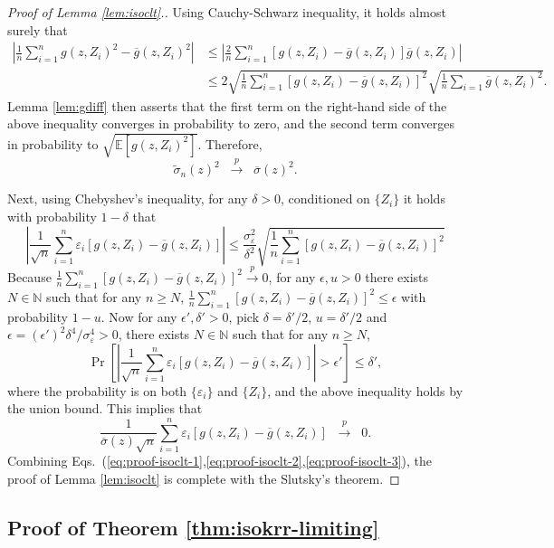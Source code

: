 \documentclass[aos]{imsart}
\renewcommand{\tilde}{\widetilde}
\renewcommand{\bar}{\overline}
\theoremstyle{plain}
\theoremstyle{definition}
\theoremstyle{definition}
\begin{document}
\begin{appendix}
\begin{proof}[Proof of Lemma \ref{lem:isoclt}.]
Using Cauchy-Schwarz inequality, it holds almost surely that
\begin{align*}
\left|\frac{1}{n}\sum_{i=1}^n g(z,Z_i)^2-\bar g(z,Z_i)^2\right| &\leq \left|\frac{2}{n}\sum_{i=1}^n [g(z,Z_i)-\bar g(z,Z_i)]\bar g(z,Z_i)\right|\\
&\leq 2\sqrt{\frac{1}{n}\sum_{i=1}^n[g(z,Z_i)-\bar g(z,Z_i)]^2}\sqrt{\frac{1}{n}\sum_{i=1}\bar g(z,Z_i)^2}.
\end{align*}
Lemma \ref{lem:gdiff} then asserts that the first term on the right-hand side of the above inequality converges in probability to zero, and the second term converges in probability to $\sqrt{\mathbb E[g(z,Z_i)^2]}$.
Therefore,
\begin{equation}
\tilde\sigma_n(z)^2 \;\;\overset{p}{\to}\;\; \bar\sigma(z)^2.
\label{eq:proof-isoclt-2}
\end{equation}

Next, using Chebyshev's inequality, for any $\delta>0$, conditioned on $\{Z_i\}$ it holds with probability $1-\delta$ that
$$
\left|\frac{1}{\sqrt{n}}\sum_{i=1}^n\varepsilon_i[g(z,Z_i)-\bar g(z,Z_i)]\right| \leq \frac{\sigma_\varepsilon^2}{\delta^2}\sqrt{\frac{1}{n}\sum_{i=1}^n[g(z,Z_i)-\bar g(z,Z_i)]^2} 
$$
Because $\frac{1}{n}\sum_{i=1}^n[g(z,Z_i)-\bar g(z,Z_i)]^2\overset{p}{\to}0$, for any $\epsilon,u>0$ there exists $N\in\mathbb N$ such that for any $n\geq N$, $\frac{1}{n}\sum_{i=1}^n[g(z,Z_i)-\bar g(z,Z_i)]^2\leq\epsilon$
with probability $1-u$.
Now for any $\epsilon',\delta'>0$, pick $\delta=\delta'/2$, $u=\delta'/2$ and $\epsilon=(\epsilon')^2\delta^4/\sigma_\varepsilon^4>0$, there exists $N\in\mathbb N$ such that for any $n\geq N$, 
$$
\Pr\left[\left|\frac{1}{\sqrt{n}}\sum_{i=1}^n\varepsilon_i[g(z,Z_i)-\bar g(z,Z_i)]\right|>\epsilon'\right]\leq\delta',
$$
where the probability is on both $\{\varepsilon_i\}$ and $\{Z_i\}$, and the above inequality holds by the union bound.
This implies that
\begin{equation}
\frac{1}{\bar\sigma(z)\sqrt{n}}\sum_{i=1}^n\varepsilon_i[g(z,Z_i)-\bar g(z,Z_i)] \;\;\overset{p}{\to}\;\; 0.
\label{eq:proof-isoclt-3}
\end{equation}
Combining Eqs.~(\ref{eq:proof-isoclt-1},\ref{eq:proof-isoclt-2},\ref{eq:proof-isoclt-3}), the proof of Lemma \ref{lem:isoclt} is complete with the Slutsky's theorem.
\end{proof}


\subsection{Proof of Theorem \ref{thm:isokrr-limiting}}


\end{appendix}
\end{document}
